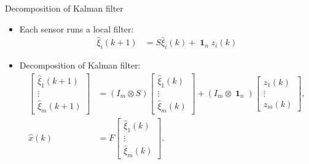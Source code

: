 \documentclass[10pt]{beamer}
\DeclareMathOperator{\1}{\textbf{1}}
\begin{document}

	  \begin{frame}{Decomposition of Kalman filter}
	    \begin{itemize}
	      \item Each sensor runs a local filter:
		\begin{align*}
		  \hat \xi_i(k+1)&=S\hat\xi_i(k)+\1_n z_i(k)
		\end{align*}

	      \item Decomposition of Kalman filter:
		\begin{align}
		  \begin{bmatrix}
		    \hat \xi_1(k+1) \\
		    \vdots\\
		    \hat \xi_m(k+1)
		  \end{bmatrix}&=
		  (I_m\otimes S)
		  \begin{bmatrix}
		    \hat \xi_1(k) \\
		    \vdots\\
		    \hat \xi_m(k)
		  \end{bmatrix}+
		  (I_m\otimes \1_n)
		  \begin{bmatrix}
		    z_1(k) \\
		    \vdots\\
		    z_m(k)
		  \end{bmatrix},\\
		  \hat{x}(k) &= F
		  \begin{bmatrix}
		    \hat \xi_1(k) \\
		    \vdots\\
		    \hat \xi_m(k)
		  \end{bmatrix}.
		\end{align}
	    \end{itemize}
	  \end{frame}
\end{document}
